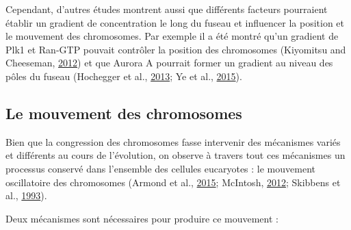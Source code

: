 \documentclass[12pt,a4paper,twoside,openright]{book}
\begin{document}
Cependant, d'autres études montrent aussi que différents facteurs
pourraient établir un gradient de concentration le long du fuseau et
influencer la position et le mouvement des chromosomes. Par exemple il a
été montré qu'un gradient de Plk1 et Ran-GTP pouvait contrôler la
position des chromosomes (Kiyomitsu and Cheeseman,
\protect\hyperlink{ref-Kiyomitsu2012}{2012}) et que Aurora A pourrait
former un gradient au niveau des pôles du fuseau (Hochegger et al.,
\protect\hyperlink{ref-Hochegger2013}{2013}; Ye et al.,
\protect\hyperlink{ref-Ye2015}{2015}).

\subsection{Le mouvement des
chromosomes}\label{le-mouvement-des-chromosomes}

Bien que la congression des chromosomes fasse intervenir des mécanismes
variés et différents au cours de l'évolution, on observe à travers tout
ces mécanismes un processus conservé dans l'ensemble des cellules
eucaryotes : le mouvement oscillatoire des chromosomes (Armond et al.,
\protect\hyperlink{ref-Armond2015}{2015}; McIntosh,
\protect\hyperlink{ref-McIntosh2012}{2012}; Skibbens et al.,
\protect\hyperlink{ref-Skibbens1993}{1993}).

Deux mécanismes sont nécessaires pour produire ce mouvement :
\end{document}
